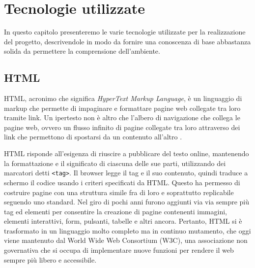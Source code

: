 \clearpage{\pagestyle{empty}\cleardoublepage}
\chapter{Tecnologie utilizzate}
In questo capitolo presenteremo le varie tecnologie utilizzate per la realizzazione del progetto, descrivendole in modo da fornire una conoscenza di base abbastanza solida da permettere la comprensione dell'ambiente.

\section{HTML}
HTML, acronimo che significa \textit{HyperText Markup Language}, è un linguaggio di markup che permette di impaginare e formattare pagine web collegate tra loro tramite link. Un ipertesto non è altro che l'albero di navigazione che collega le pagine web, ovvero un flusso infinito di pagine collegate tra loro attraverso dei link che permettono di spostarsi da un contenuto all'altro \cite{HTML, HTML_Mozilla}.

HTML risponde all'esigenza di riuscire a pubblicare del testo online, mantenendo la formattazione e il significato di ciascuna delle sue parti, utilizzando dei marcatori detti \Verb_<tag>_. Il browser legge il tag e il suo contenuto, quindi traduce a schermo il codice usando i criteri specificati da HTML. Questo ha permesso di costruire pagine con  una struttura simile fra di loro e soprattutto replicabile seguendo uno standard. Nel giro di pochi anni furono aggiunti via via sempre più tag ed elementi per consentire la creazione di pagine contenenti immagini, elementi interattivi, form, pulsanti, tabelle e altri ancora. Pertanto, HTML si è trasformato in un linguaggio molto completo ma in continuo mutamento, che oggi viene mantenuto dal World Wide Web Consortium (W3C), una associazione non governativa che si occupa di implementare nuove funzioni per rendere il web sempre più libero e accessibile.

